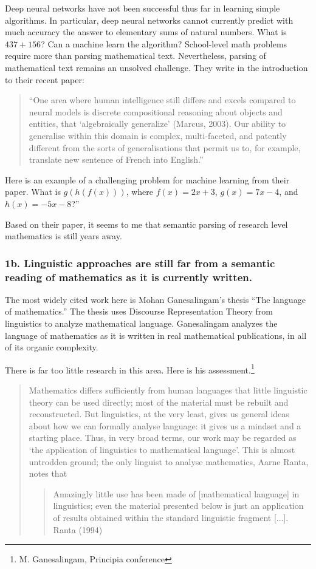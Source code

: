 \documentclass[12pt]{amsart}
\renewcommand{\~}{\ }
\renewcommand{\_}{\textunderscore}
\begin{document}
Deep neural networks have not been successful thus far in learning
simple algorithms.  In particular, deep neural networks cannot
currently predict with much accuracy the answer to elementary sums of
natural numbers.  What is $437+156$?  Can a machine learn
the algorithm?  School-level math problems require more than parsing
mathematical text.  Nevertheless, parsing of mathematical text remains
an unsolved challenge. They write in the introduction to their recent
paper:

\begin{quote}
``One area where human intelligence still differs and excels compared
to neural models is discrete compositional reasoning about objects and
entities, that `algebraically generalize' (Marcus, 2003). Our ability
to generalise within this domain is complex, multi-faceted, and
patently different from the sorts of generalisations that permit us
to, for example, translate new sentence of French into English.''
\end{quote}

Here is an example of a challenging problem for machine learning from
their paper.  What is $g(h(f(x)))$, where $f(x) = 2x + 3$, $g(x) = 7x
- 4$, and $h(x) = -5x - 8$?''

Based on their paper,
it seems to me that semantic parsing of research level mathematics is
still years away.

\subsubsection*{1b.  Linguistic approaches are still far from a
  semantic reading of mathematics as it is currently written.}

The most widely cited work here is Mohan Ganesalingam's thesis ``The
language of mathematics.''  The thesis uses Discourse Representation
Theory from linguistics to analyze mathematical language.
Ganesalingam analyzes the language of mathematics as it is written in
real mathematical publications, in all of its organic complexity.

There is far too little research in this area.
Here is his assessment.\footnote{M. Ganesalingam, Principia conference}


\begin{quote}
Mathematics differs sufficiently from human languages that little
linguistic theory can be used directly; most of the material must be
rebuilt and reconstructed. But linguistics, at the very least, gives
us general ideas about how we can formally analyse language: it gives
us a mindset and a starting place. Thus, in very broad terms, our work
may be regarded as `the application of linguistics to mathematical
language'. This is almost untrodden ground; the only linguist to
analyse mathematics, Aarne Ranta, notes that
\begin{quote}
  Amazingly little use has been made of [mathematical language] in
  linguistics; even the material presented below is just an
  application of results obtained within the standard linguistic
  fragment [...].  Ranta (1994)
\end{quote}
\end{quote}
\end{document}
